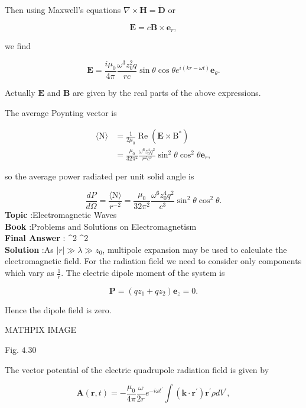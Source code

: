 \documentclass[10pt]{article}
\begin{document}
Then using Maxwell's equations $\nabla \times \mathbf{H}=\dot{\mathbf{D}}$ or

$$
\mathbf{E}=c \mathbf{B} \times \mathbf{e}_{r},
$$

we find

$$
\mathbf{E}=\frac{i \mu_{0}}{4 \pi} \frac{\omega^{3} z_{0}^{2} q}{r c} \sin \theta \cos \theta e^{i(k r-\omega t)} \mathbf{e}_{\theta} .
$$

Actually $\mathbf{E}$ and $\mathbf{B}$ are given by the real parts of the above expressions.

 The average Poynting vector is

$$
\begin{aligned}
\langle\mathrm{N}\rangle &=\frac{1}{2 \mu_{0}} \operatorname{Re}\left(\mathbf{E} \times \mathrm{B}^{*}\right) \\
&=\frac{\mu_{0}}{32 \pi^{2}} \frac{\omega^{6} z_{0}^{4} q^{2}}{r^{2} c^{3}} \sin ^{2} \theta \cos ^{2} \theta \mathbf{e}_{r},
\end{aligned}
$$

so the average power radiated per unit solid angle is

$$
\frac{d P}{d \Omega}=\frac{\langle\mathrm{N}\rangle}{r^{-2}}=\frac{\mu_{0}}{32 \pi^{2}} \frac{\omega^{6} z_{0}^{4} q^{2}}{c^{3}} \sin ^{2} \theta \cos ^{2} \theta .
$$
\textbf{Topic} :Electromagnetic Waves\\
\textbf{Book} :Problems and Solutions on Electromagnetism\\
\textbf{Final Answer} :  \sin ^{2} \theta \cos ^{2} \theta\\


\textbf{Solution} :As $|r| \gg \lambda \gg z_{0}$, multipole expansion may be used to calculate the electromagnetic field. For the radiation field we need to consider only components which vary as $\frac{1}{r}$. The electric dipole moment of the system is

$$
\mathbf{P}=\left(q z_{1}+q z_{2}\right) \mathbf{e}_{z}=0 .
$$

Hence the dipole field is zero.

MATHPIX IMAGE

Fig. $4.30$

The vector potential of the electric quadrupole radiation field is given by

$$
\mathbf{A}(\mathbf{r}, t)=-\frac{\mu_{0}}{4 \pi} \frac{\omega}{2 r} e^{-i \omega t^{\prime}} \int\left(\mathbf{k} \cdot \mathbf{r}^{\prime}\right) \mathbf{r}^{\prime} \rho d V^{\prime},
$$
\end{document}
